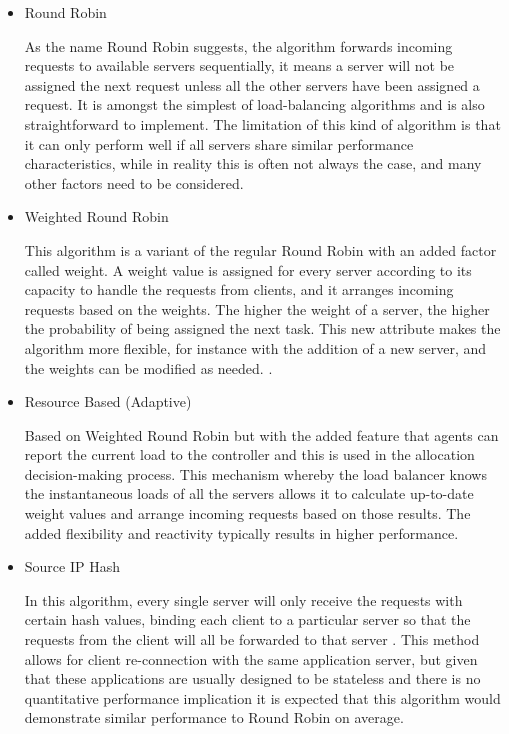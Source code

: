 \begin{itemize}
    \item Round Robin
    
    As the name Round Robin suggests, the algorithm forwards incoming requests to available servers sequentially, it means a server will not be assigned the next request unless all the other servers have been assigned a request. It is amongst the simplest of load-balancing algorithms and is also straightforward to implement. The limitation of this kind of algorithm is that it can only perform well if all servers share similar performance characteristics, while in reality this is often not always the case, and many other factors need to be considered.\cite{PerformanceAnalysis1}
    
    \item Weighted Round Robin 
    
    This algorithm is a variant of the regular Round Robin with an added factor called weight. A weight value is assigned for every server according to its capacity to handle the requests from clients, and it arranges incoming requests based on the weights. The higher the weight of a server, the higher the probability of being assigned the next task. This new attribute makes the algorithm more flexible, for instance with the addition of a new server, and the weights can be modified as needed. \cite{WeightedRoundRobin}.
    
    \item Resource Based (Adaptive) 
    
    Based on Weighted Round Robin but with the added feature that agents can report the current load to the controller and this is used in the allocation decision-making process. This mechanism whereby the load balancer knows the instantaneous loads of all the servers allows it to calculate up-to-date weight values and arrange incoming requests based on those results. The added flexibility and reactivity typically results in higher performance. \cite{LoadBalancingAlgorithms2}
    
    \item Source IP Hash
    
    In this algorithm, every single server will only receive the requests with certain hash values, binding each client to a particular server so that the requests from the client will all be forwarded to that server \cite{kemp_2022}. This method allows for client re-connection with the same application server, but given that these applications are usually designed to be stateless and there is no quantitative performance implication it is expected that this algorithm would demonstrate similar performance to Round Robin on average.
    

\end{itemize}
